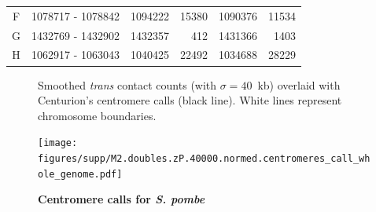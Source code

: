 \begin{table}[ht!]
\begin{center}
\begin{tabular}{c | c  r  r  r  r}
F & \num[group-separator={\,}]{1078717} - \num[group-separator={\,}]{1078842} & \num[group-separator={\,}]{1094222} & \small{\num[group-separator={\,}]{15380}}  & \num[group-separator={\,}]{1090376} & \small{\num[group-separator={\,}]{11534}}  \\
G & \num[group-separator={\,}]{1432769} - \num[group-separator={\,}]{1432902} & \num[group-separator={\,}]{1432357} & \small{\num[group-separator={\,}]{412}}  & \num[group-separator={\,}]{1431366} & \small{\num[group-separator={\,}]{1403}}  \\
H & \num[group-separator={\,}]{1062917} - \num[group-separator={\,}]{1063043} & \num[group-separator={\,}]{1040425} & \small{\num[group-separator={\,}]{22492}}  & \num[group-separator={\,}]{1034688} & \small{\num[group-separator={\,}]{28229}}  \\
\end{tabular}
\end{center}
\end{table}


\clearpage


\begin{figure}[ht!]
\caption{\textbf{Centromere calls for \textit{S. pombe}}}{
Smoothed \textit{trans} contact counts (with $\sigma=40$~kb) overlaid with
Centurion's centromere calls (black line). White lines represent chromosome
boundaries.
}

\begin{center}
\texttt{[image: figures/supp/M2.doubles.zP.40000.normed.centromeres\_call\_whole\_genome.pdf]}
\end{center}
\label{suppfig:zP_calls}
\end{figure}


